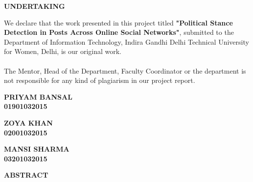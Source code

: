 \documentclass[a4paper,11pt]{article}
\begin{document}
\newpage
{\LARGE \bfseries UNDERTAKING}
\vspace*{5mm}
\medskip\\
 \begin{spacing}{1.5}
   We declare that the work presented in this project titled \textbf{"Political Stance Detection in Posts Across Online Social Networks"}, submitted to the Department of Information Technology, Indira Gandhi Delhi Technical University for Women, Delhi, is our original work. \\
    \\
   The Mentor, Head of the Department, Faculty Coordinator or the department is not responsible for any kind of plagiarism in our project report. 
    
  \vspace*{2.5cm}
  {\hspace*{\fill} {\textbf{PRIYAM BANSAL\\\hspace*{\fill}01901032015}}}

 \vspace*{0.1cm}
{\hspace*{\fill} {\textbf{ZOYA KHAN\\\hspace*{\fill}02001032015}}}
 
 
 \vspace*{0.1cm}
{\hspace*{\fill} {\textbf{MANSI SHARMA\\\hspace*{\fill}03201032015}}}
 \end{spacing}


\newpage
{\LARGE \bfseries ABSTRACT}
\vspace*{5mm}
\medskip\\
\end{document}
